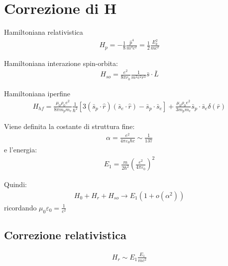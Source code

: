 \section{Correzione di H} %
Hamiltoniana relativistica
\begin{equation}\begin{split}
H_p=-\frac{1}{8}\frac{\hat p^{4}}{m^3c^2}=\frac{1}{2}\frac{E_k^2}{mc^2}
\end{split}\end{equation}

Hamiltoniana interazione spin-orbita:
\begin{equation}\begin{split}
H_{so}=\frac{e^2}{8\pi r_0}\frac{1}{m^2c^2r^3}\bar s\cdot \bar L
\end{split}\end{equation}

Hamiltoniana iperfine
\begin{equation}\begin{split}
H_{hf}=\frac{\mu_0\rho_0e^2}{8\pi m_pm_e}\frac{1}{\hbar ^2}\left[3\left(\bar s_p\cdot \hat r\right)\left(\bar s_e\cdot \hat r\right)-\bar s_p\cdot \bar s_e\right]+\frac{\mu_0\rho_0e^2}{3m_pm_e}\bar s_p\cdot \bar s_e\delta\left(\bar r\right)
\end{split}\end{equation}

Viene definita la costante di struttura fine:
\begin{equation}\begin{split}
\alpha=\frac{e^2}{4\pi\varepsilon_0\hbar c}\sim \frac{1}{137}
\end{split}\end{equation}
e l'energia:
\begin{equation}\begin{split}
E_1=\frac{m}{2\hbar ^2}\left(\frac{e^2}{4\pi\varepsilon_0}\right)^2
\end{split}\end{equation}

Quindi:
\begin{equation}\begin{split}
H_0+H_r+H_{so}\rightarrow E_1\left(1+o\left(\alpha^2\right)\right)
\end{split}\end{equation}
ricordando $\mu_0\varepsilon_0=\frac{1}{c^2}$

\subsection{Correzione relativistica} %
\begin{equation}\begin{split}
H_r\sim E_1\frac{E_1}{mc^2}
\end{split}\end{equation}

